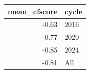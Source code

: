 \begin{tabular}{rl}
  \hline
mean\_cfscore & cycle \\ 
  \hline
-0.63 & 2016 \\ 
  -0.77 & 2020 \\ 
  -0.85 & 2024 \\ 
  -0.81 & All \\ 
   \hline
\end{tabular}
